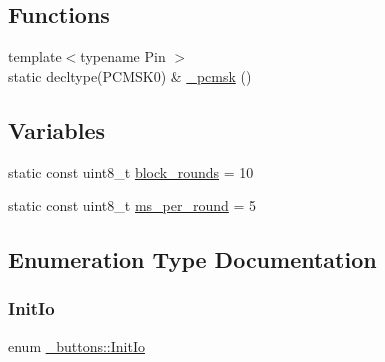 \subsection*{Functions}
\begin{DoxyCompactItemize}
\item 
{\footnotesize template$<$typename Pin $>$ }\\static decltype(P\+C\+M\+S\+K0) \& \hyperlink{namespace__buttons_a0ed7077aa639e3ca9fb1ab787afcb77a}{\+\_\+pcmsk} ()
\end{DoxyCompactItemize}
\subsection*{Variables}
\begin{DoxyCompactItemize}
\item 
static const uint8\+\_\+t \hyperlink{namespace__buttons_a6b48336b8f5ba167d870f9d6e6dd2125}{block\+\_\+rounds} = 10
\item 
static const uint8\+\_\+t \hyperlink{namespace__buttons_aef8eb0435c3dc3b3515745107a52ab68}{ms\+\_\+per\+\_\+round} = 5
\end{DoxyCompactItemize}


\subsection{Enumeration Type Documentation}
\hypertarget{namespace__buttons_ac0ca837263eab23747f0915e8d1e81ce}{}\label{namespace__buttons_ac0ca837263eab23747f0915e8d1e81ce} 
\subsubsection{\texorpdfstring{Init\+Io}{InitIo}}
{\footnotesize\ttfamily enum \hyperlink{namespace__buttons_ac0ca837263eab23747f0915e8d1e81ce}{\+\_\+buttons\+::\+Init\+Io}}

